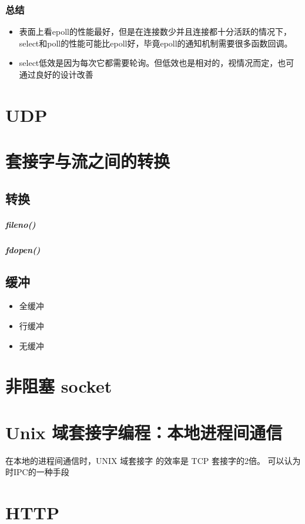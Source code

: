 \documentclass[UTF8,a4paper,8pt]{ctexbook}
\begin{document}
				
			\subsubsection{总结}
				\begin{itemize}
					\item   表面上看epoll的性能最好，但是在连接数少并且连接都十分活跃的情况下，select和poll的性能可能比epoll好，毕竟epoll的通知机制需要很多函数回调。
					\item select低效是因为每次它都需要轮询。但低效也是相对的，视情况而定，也可通过良好的设计改善
				\end{itemize}
	\section{UDP}
		
	\section{套接字与流之间的转换}
		\subsection{转换}
			\subparagraph{fileno()}
			
			\subparagraph{fdopen()}
			
		\subsection{缓冲}
			\begin{itemize}
				\item 全缓冲
				\item 行缓冲
				\item 无缓冲
			\end{itemize}
			
	\section{非阻塞 socket}
		
	
	\section{Unix 域套接字编程：本地进程间通信}
		在本地的进程间通信时，UNIX 域套接字 的效率是 TCP 套接字的2倍。 可以认为时IPC的一种手段

	\section{HTTP}
\end{document}
